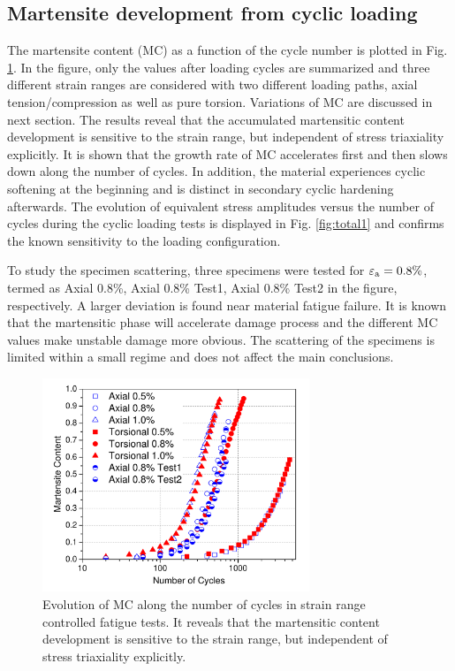 \documentclass[final,5p,times,onecolumn,10pt,sort&compress]{elsarticle}
\begin{document}
\subsection{Martensite development from cyclic loading}

The martensite content (MC) as a function of the cycle number is plotted in Fig. \ref{fig:total2}.  In the figure, only the values after loading cycles are summarized and three different strain ranges are considered with two different loading paths, axial tension/compression as well as pure torsion. Variations of  MC are discussed in next section. The results reveal that the accumulated martensitic content development is sensitive to the strain range, but independent of stress triaxiality explicitly. It is shown that the growth rate of MC accelerates first and then slows down along the number of cycles. In addition, the material experiences cyclic softening at the beginning and is distinct in secondary cyclic hardening afterwards. The evolution of equivalent stress amplitudes versus the number of cycles during the cyclic loading tests is displayed in Fig. \ref{fig:total1} and confirms the known sensitivity to the loading configuration.

To study the specimen scattering, three specimens were tested for $\varepsilon_{\rm a}=0.8\%$, termed as Axial 0.8\%, Axial 0.8\% Test1, Axial 0.8\% Test2 in the figure, respectively. A larger deviation is found near material fatigue failure.  It is known that the martensitic phase will accelerate damage process and the different MC values make unstable damage more obvious. The scattering of the specimens is limited within a small regime and does not affect the main conclusions.

\begin{figure}[!h]
  \begin{center}
  \includegraphics[width=8cm]{total2.pdf}
  \caption{Evolution of MC along the number of cycles in strain range controlled fatigue tests. It reveals that the martensitic content development is sensitive to the strain range, but independent of stress triaxiality explicitly.}
  \label{fig:total2}
  \end{center}
\end{figure}
\end{document}

